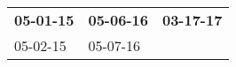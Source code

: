 \begin{supertabular}{p{0.33\columnwidth}p{0.33\columnwidth}p{0.33\columnwidth}}
 \textbf{05-01-15\textsuperscript{}} &  \textbf{05-06-16\textsuperscript{}} &  \textbf{03-17-17\textsuperscript{}} \\
          05-02-15\textsuperscript{} &           05-07-16\textsuperscript{} &                                      \\
\end{supertabular}
